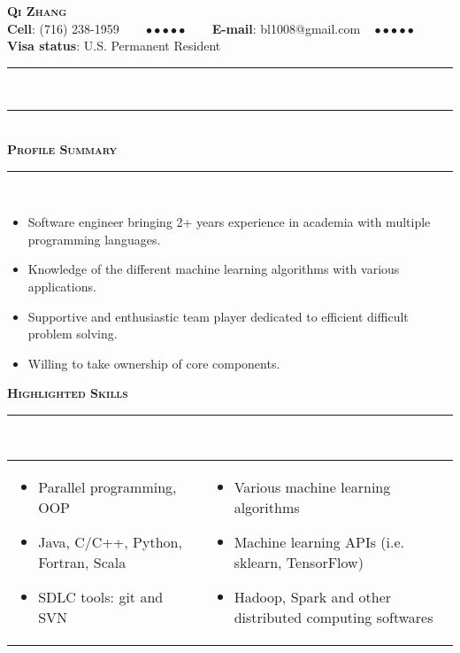 \documentclass[11pt]{article}
\begin{document}
\begin{center}
{\Huge\textbf{\textsc{{Qi Zhang}}}} \\[5pt]
\textbf{Cell}: (716) 238-1959 $\text{ }\quad\bullet\bullet\bullet\bullet\bullet\quad\text{ }$ \textbf{E-mail}: bl1008@gmail.com \quad$\text{ }\bullet\bullet\bullet\bullet\bullet\quad\text{  }$ \textbf{Visa status}: U.S. Permanent Resident 
\end{center}
 \rule[0.8em]{\textwidth}{0.5pt} \\[-11pt]
 \rule[0.8em]{\textwidth}{0.5pt} \\[0pt]
\textbf{\textsc{\LARGE{Profile Summary}}} \\ \rule[0.8em]{\textwidth}{0.5pt} \\[-20pt]
\begin{itemize}[topsep=0pt,partopsep=0pt,leftmargin=16pt]
\item Software engineer bringing 2+ years experience in academia with multiple programming languages.
\item Knowledge of the different machine learning algorithms with various applications. 
\item Supportive and enthusiastic team player dedicated to efficient difficult problem solving.
\item Willing to take ownership of core components.
\end{itemize}
\vspace{12pt}
\textbf{\textsc{\LARGE{Highlighted Skills}}} \\ \rule[0.8em]{\textwidth}{0.5pt} \\[-12pt]
\begin{tabularx}{\textwidth}{>{\raggedright}X>{\raggedleft}p{}}
\begin{itemize}[topsep=0pt,partopsep=0pt,leftmargin=16pt]
\item Parallel programming, OOP 
\item Java, C/C++, Python, Fortran, Scala 
\item SDLC tools: git and SVN
\end{itemize}
&
\begin{itemize}[topsep=0pt,partopsep=0pt,leftmargin=16pt]
\item Various machine learning algorithms
\item Machine learning APIs (i.e. sklearn, TensorFlow)
\item Hadoop, Spark and other distributed computing softwares
\end{itemize}
\tabularnewline[-12pt]
\end{tabularx}
\vspace{6pt}
\end{document}
